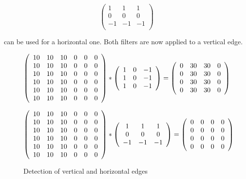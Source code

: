 {$$\left(
\begin{array}{ccc}
    1 &  1 &  1 \\
    0 &  0 &  0 \\
    -1 & -1 & -1 \\
\end{array}
\right)
$$

can be used for a horizontal one. Both filters are now applied to a vertical edge.


\begin{figure}
$$
\left(
\begin{array}{ccc ccc}
    10 & 10 & 10 & 0 & 0 & 0 \\
    10 & 10 & 10 & 0 & 0 & 0 \\
    10 & 10 & 10 & 0 & 0 & 0 \\
    10 & 10 & 10 & 0 & 0 & 0 \\
    10 & 10 & 10 & 0 & 0 & 0 \\
    10 & 10 & 10 & 0 & 0 & 0 \\
\end{array}
\right)
\ast
\left(
\begin{array}{ccc}
    1 & 0 & -1 \\
    1 & 0 & -1 \\
    1 & 0 & -1 \\
\end{array}
\right)
=
\left(
\begin{array}{cccc}
    0 & 30 & 30 & 0 \\
    0 & 30 & 30 & 0 \\
    0 & 30 & 30 & 0 \\
    0 & 30 & 30 & 0 \\
\end{array}
\right)
$$

$$
\left(
\begin{array}{ccc ccc}
    10 & 10 & 10 & 0 & 0 & 0 \\
    10 & 10 & 10 & 0 & 0 & 0 \\
    10 & 10 & 10 & 0 & 0 & 0 \\
    10 & 10 & 10 & 0 & 0 & 0 \\
    10 & 10 & 10 & 0 & 0 & 0 \\
    10 & 10 & 10 & 0 & 0 & 0 \\
\end{array}
\right)
\ast
\left(
\begin{array}{ccc}
    1 &  1 &  1 \\
    0 &  0 &  0 \\
    -1 & -1 & -1 \\
\end{array}
\right)
=
\left(
\begin{array}{cccc}
    0 & 0 & 0 & 0 \\
    0 & 0 & 0 & 0 \\
    0 & 0 & 0 & 0 \\
    0 & 0 & 0 & 0 \\
\end{array}
\right)
$$
  \caption{Detection of vertical and horizontal edges}
\end{figure}

}
